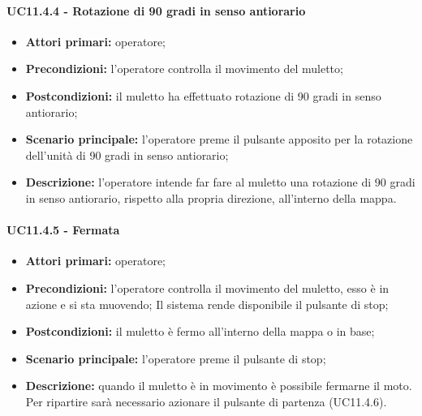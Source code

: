 \paragraph{UC11.4.4 - Rotazione di 90 gradi in senso antiorario}
\begin{itemize}
	\item 	\textbf{Attori primari:} operatore;
	\item 	\textbf{Precondizioni:} l'operatore controlla il movimento del muletto;
	\item 	\textbf{Postcondizioni:} il muletto ha effettuato rotazione di 90 gradi in senso antiorario; 
	\item 	\textbf{Scenario principale:} l'operatore preme il pulsante apposito per la rotazione dell'unità di 90 gradi in senso antiorario;
	\item 	\textbf{Descrizione:} l'operatore intende far fare al muletto una rotazione di 90 gradi in senso antiorario, rispetto alla propria direzione, all'interno della mappa.
\end{itemize}


\paragraph{UC11.4.5 - Fermata}
\begin{itemize}
	\item 	\textbf{Attori primari:} operatore;
	\item 	\textbf{Precondizioni:} l'operatore controlla il movimento del muletto, esso è in azione e si sta muovendo; Il sistema rende disponibile il pulsante di stop;
	\item 	\textbf{Postcondizioni:} il muletto è fermo all'interno della mappa o in base;
	\item 	\textbf{Scenario principale:} l'operatore preme il pulsante di stop;
	\item 	\textbf{Descrizione:} quando il muletto è in movimento è possibile fermarne il moto. Per ripartire sarà necessario azionare il pulsante di partenza (UC11.4.6).
\end{itemize}


